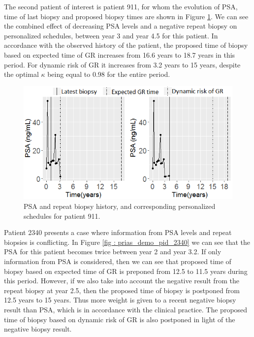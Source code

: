 
The second patient of interest is patient 911, for whom the evolution of PSA, time of last biopsy and proposed biopsy times are shown in Figure \ref{fig : prias_demo_pid_911}. We can see the combined effect of decreasing PSA levels and a negative repeat biopsy on personalized schedules, between year 3 and year 4.5 for this patient. In accordance with the observed history of the patient, the proposed time of biopsy based on expected time of GR increases from 16.6 years to 18.7 years in this period. For dynamic risk of GR it increases from 3.2 years to 15 years, despite the optimal $\kappa$ being equal to 0.98 for the entire period. 


\begin{figure}
\centerline{
\includegraphics[width=\columnwidth]{images/prias_demo/case_911.png}
}
\caption{PSA and repeat biopsy history, and corresponding personalized schedules for patient 911.}
\label{fig : prias_demo_pid_911}
\end{figure}

Patient 2340 presents a case where information from PSA levels and repeat biopsies is conflicting. In Figure \ref{fig : prias_demo_pid_2340} we can see that the PSA for this patient becomes twice between year 2 and year 3.2. If only information from PSA is considered, then we can see that proposed time of biopsy based on expected time of GR is preponed from 12.5 to 11.5 years during this period. However, if we also take into account the negative result from the repeat biopsy at year 2.5, then the proposed time of biopsy is postponed from 12.5 years to 15 years. Thus more weight is given to a recent negative biopsy result than PSA, which is in accordance with the clinical practice. The proposed time of biopsy based on dynamic risk of GR is also postponed in light of the negative biopsy result.

